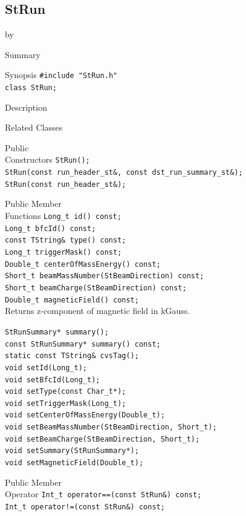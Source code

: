 \documentclass[twoside]{article}
\newcommand{\entrylabel}[1]{\mbox{\textbf{{#1}}}\hfil}%
\newenvironment{entry}
{\begin{list}{}%
    {\renewcommand{\makelabel}{\entrylabel}%
     \setlength{\labelwidth}{90pt}%
     \setlength{\leftmargin}{\labelwidth}
     \advance\leftmargin by \labelsep%
      }%
    }%
  {\end{list}}
\newcommand{\Entrylabel}[1]%
{\raisebox{0pt}[1ex][0pt]{\makebox[\labelwidth][l]%
    {\parbox[t]{\labelwidth}{\hspace{0pt}\textbf{{#1}}}}}}
\newenvironment{Entry}%
{\renewcommand{\entrylabel}{\Entrylabel}\begin{entry}}%
  {\end{entry}}
\begin{document}
\subsection{StRun}
\label{sec:StRun}
\begin{Entry}
\item[Summary]
\item[Synopsis]
    \verb+#include "StRun.h"+\\
    \verb+class StRun;+\\
\item[Description]
\item[Related Classes]
\item[Public\\ Constructors]
    \verb+StRun();+\\
    \verb+StRun(const run_header_st&, const dst_run_summary_st&);+\\
    \verb+StRun(const run_header_st&);+\\
\item[Public Member\\ Functions]
    \verb+Long_t id() const;+\\
    \verb+Long_t bfcId() const;+\\
    \verb+const TString& type() const;+\\
    \verb+Long_t triggerMask() const;+\\
    \verb+Double_t centerOfMassEnergy() const;+\\
    \verb+Short_t beamMassNumber(StBeamDirection) const;+\\
    \verb+Short_t beamCharge(StBeamDirection) const;+\\

    \verb+Double_t magneticField() const;+\\
    Returns z-component of magnetic field in kGauss.
    
    \verb+StRunSummary* summary();+\\
    \verb+const StRunSummary* summary() const;+\\
    \verb+static const TString& cvsTag();+\\
    \verb+void setId(Long_t);+\\
    \verb+void setBfcId(Long_t);+\\
    \verb+void setType(const Char_t*);+\\
    \verb+void setTriggerMask(Long_t);+\\
    \verb+void setCenterOfMassEnergy(Double_t);+\\
    \verb+void setBeamMassNumber(StBeamDirection, Short_t);+\\
    \verb+void setBeamCharge(StBeamDirection, Short_t);+\\
    \verb+void setSummary(StRunSummary*);+\\
    \verb+void setMagneticField(Double_t);+\\
\item[Public Member\\ Operator]
    \verb+Int_t operator==(const StRun&) const;+\\
    \verb+Int_t operator!=(const StRun&) const;+\\
\end{Entry}
\clearpage
\end{document}

